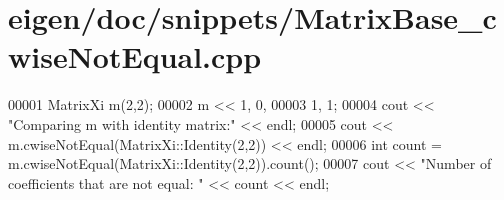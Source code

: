 \hypertarget{eigen_2doc_2snippets_2_matrix_base__cwise_not_equal_8cpp_source}{}\section{eigen/doc/snippets/\+Matrix\+Base\+\_\+cwise\+Not\+Equal.cpp}
\label{eigen_2doc_2snippets_2_matrix_base__cwise_not_equal_8cpp_source}

\begin{DoxyCode}
00001 MatrixXi m(2,2);
00002 m << 1, 0,
00003      1, 1;
00004 cout << \textcolor{stringliteral}{"Comparing m with identity matrix:"} << endl;
00005 cout << m.cwiseNotEqual(MatrixXi::Identity(2,2)) << endl;
00006 \textcolor{keywordtype}{int} count = m.cwiseNotEqual(MatrixXi::Identity(2,2)).count();
00007 cout << \textcolor{stringliteral}{"Number of coefficients that are not equal: "} << count << endl;
\end{DoxyCode}
